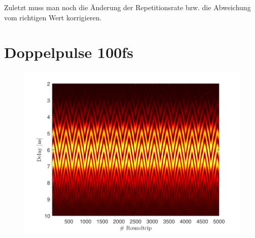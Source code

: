 \documentclass[bachelor,       %
               twoside,        %
               BCOR10mm,       %
               english,ngerman, %
               ]{GAUBM}
\begin{document}
Zuletzt muss man noch die Änderung der Repetitionsrate bzw. die Abweichung vom richtigen Wert korrigieren.


\section{Doppelpulse 100fs}
\begin{figure}
	\includegraphics[scale=1.0]{figures/4ms_25GSA_400m_MLrun_runBounceFix_4,58W_Ch_noCB}
\end{figure}
\end{document}
